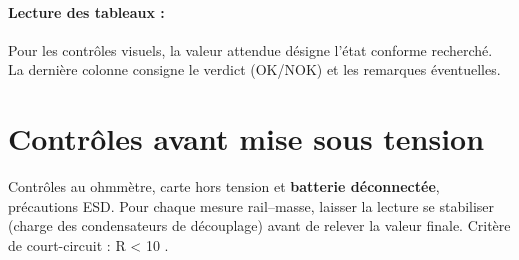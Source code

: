 \paragraph{Lecture des tableaux : }
Pour les contrôles visuels, la valeur attendue désigne l'état conforme
recherché. La dernière colonne consigne le verdict (OK/NOK) et les remarques éventuelles.

\clearpage



\section{Contrôles avant mise sous tension}

Contrôles au ohmmètre, carte hors tension et \textbf{batterie déconnectée}, précautions ESD.
Pour chaque mesure rail–masse, laisser la lecture se stabiliser (charge des condensateurs de découplage)
avant de relever la valeur finale. Critère de court-circuit : R < 10 \Omega.

